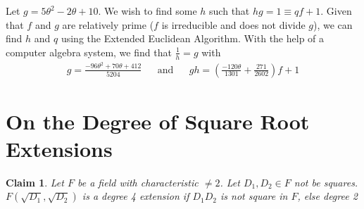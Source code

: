 \documentclass[12pt]{article}
\newtheorem*{claim*}{Claim}
\begin{document}
Let $g = 5\theta^2 - 2\theta + 10$. We wish to find some $h$ such that $hg = 1 \equiv qf + 1$. Given that $f$ and $g$ are relatively prime ($f$ is irreducible and does not divide $g$), we can find $h$ and $q$ using the Extended Euclidean Algorithm. With the help of a computer algebra system, we find that $\frac{1}{h} = g$ with
\begin{align*}
g = \frac{-96 \theta^2 + 70\theta + 412}{5204} 
&& \text{and} && 
gh = \left(\frac{-120\theta}{1301} + \frac{271}{2602}\right)f + 1
\end{align*}


\section{On the Degree of Square Root Extensions}
\begin{claim*}
Let $F$ be a field with characteristic $\neq 2$. Let $D_1, D_2 \in F$ not be squares. $F(\sqrt{D_1}, \sqrt{D_2})$ is a degree 4 extension if $D_1D_2$ is not square in $F$, else degree 2
\end{claim*}
\end{document}

